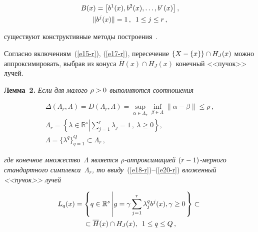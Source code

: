 \begin{multicols}{2}
\vspace*{-6pt}

\noindent
\begin{multline}
B(x)=\left[ b^1(x),b^2(x),\ldots , b^r(x)\right],\\
\| b^j(x)\|=1\,,\enskip 1\leq j\leq r\,,
\label{e19-r}
\end{multline}

\vspace*{-4pt}

\noindent
существуют конструктивные методы по\-стро\-ения~\cite{3-r}.

  Согласно включениям~(\ref{e15-r}), (\ref{e17-r}), пересечение 
  $\{X \hm- \{x\}\}\cap H_J(x)$ можно аппроксимировать, выбрав из конуса 
$\overline{H}(x)\cap H_J(x)$ конечный <<пучок>> лучей.
  
  \smallskip
  
  \noindent
  \textbf{Лемма~2.} \textit{Если для малого $\rho\hm>0$ выполняются 
соотношения}

\vspace*{-6pt}

\noindent
  \begin{multline}
  \Delta(\Lambda_r,\Lambda) =D(\Lambda_r,\Lambda)=\sup\limits_{\alpha\in 
\Lambda_r} \mathop{\mathrm{inf}}\limits_{\beta\in \Lambda} \| \alpha-\beta\|\leq 
\rho\,,\\
  \Lambda_r=\left\{ \lambda\in \mathbb{R}^s \left\vert \sum\limits^r_{j=1} \right.
\lambda_j=1\,,\ \lambda\geq 0\right\},\\
 \Lambda =\{ \lambda^q\}^Q_{q=1} \subset \Lambda_r\,,
    \label{e20-r}
  \end{multline}
  
  \vspace*{-4pt}

\noindent
\textit{где конечное множество~$\Lambda$ является $\rho$-ап\-прок\-си\-ма\-ци\-ей $(r\hm-1)$-мер\-но\-го стандартного симплекса~$\Lambda_r$, то 
ввиду}~(\ref{e18-r})--(\ref{e20-r}) \textit{вложенный <<пучок>> лучей}

\vspace*{-6pt}

\noindent
\begin{multline}
L_q(x)=\left\{ q\in \mathbb{R}^s\left\vert  g=\gamma\sum\limits^r_{j=1} \lambda_j^q 
b^j(x), \gamma\geq 0\right.\right\}\subset{}\\
{}\subset \overline{H}(x)\cap H_J(x),\enskip 1\leq q\leq Q\,,
\label{e21-r}
\end{multline}


\end{multicols}
